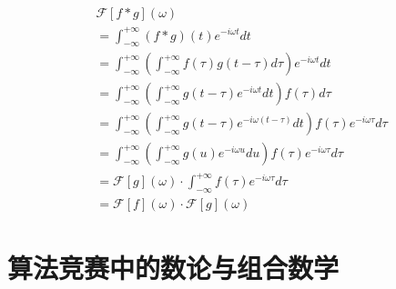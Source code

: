 \documentclass[UTF8]{book}
\begin{document}
\begin{large}
    \begin{equation}
        \begin{aligned}
            &\mathcal{F}\left [ f * g \right ](\omega) \\
            &= \int_{-\infty}^{+\infty}(f * g)(t)e^{-i\omega t}dt \\
            &= \int_{-\infty}^{+\infty}\left (\int_{-\infty}^{+\infty}f(\tau)g(t-\tau)d\tau \right ) e^{-i\omega t}dt \\
            &= \int_{-\infty}^{+\infty}\left (\int_{-\infty}^{+\infty} g(t-\tau)e^{-i\omega t}dt\right )f(\tau)d\tau \\
            &= \int_{-\infty}^{+\infty}\left (\int_{-\infty}^{+\infty} g(t-\tau)e^{-i\omega (t-\tau)}dt\right )f(\tau)e^{-i\omega \tau}d\tau \\
            &= \int_{-\infty}^{+\infty}\left (\int_{-\infty}^{+\infty} g(u)e^{-i\omega u}du\right )f(\tau)e^{-i\omega \tau}d\tau \\
            &= \mathcal{F}\left [ g\right ](\omega) \cdot \int_{-\infty}^{+\infty}f(\tau)e^{-i\omega \tau}d\tau \\
            &= \mathcal{F}\left [f\right ](\omega) \cdot \mathcal{F}\left [g\right ](\omega)
            \nonumber
        \end{aligned}
    \end{equation}
\end{large}

\section{算法竞赛中的数论与组合数学}
\end{document}
